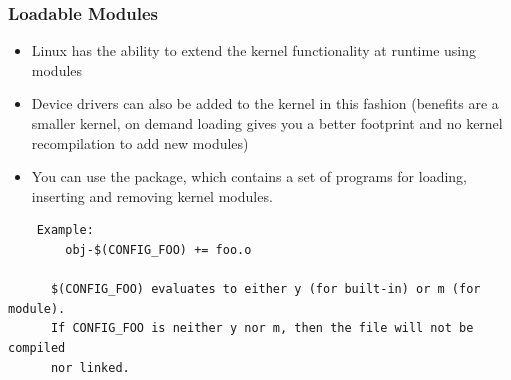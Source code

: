 \documentclass[xcolor=dvipsnames,compress]{beamer}
\newcommand\Fontvi{\fontsize{6}{7.2}\selectfont}
\begin{document}
\begin{frame}[fragile]
\frametitle{Loadable Modules}
    \begin{itemize}
    \item Linux has the ability to extend the kernel functionality at runtime using modules
    \item Device drivers can also be added to the kernel in this fashion (benefits are a smaller kernel, on demand loading gives you a better footprint and no  kernel recompilation to add new modules)
    \item You can use the  package, which contains a set of programs for loading, inserting and removing kernel modules.
    \end{itemize}
    \Fontvi
    \begin{verbatim}
    Example:
        obj-$(CONFIG_FOO) += foo.o

      $(CONFIG_FOO) evaluates to either y (for built-in) or m (for module).
      If CONFIG_FOO is neither y nor m, then the file will not be compiled
      nor linked.
    \end{verbatim}
\end{frame}
\end{document}
